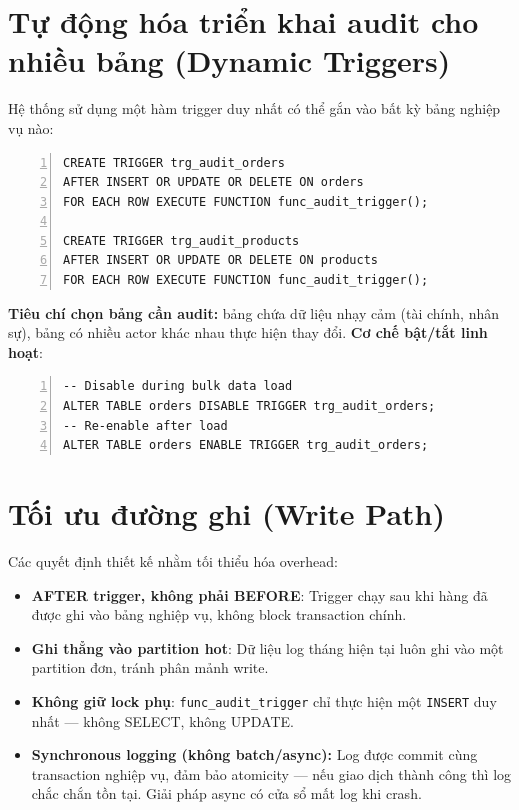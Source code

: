 \section{Tự động hóa triển khai audit cho nhiều bảng (Dynamic Triggers)}

Hệ thống sử dụng một hàm trigger duy nhất có thể gắn vào bất kỳ bảng nghiệp vụ nào:

\begin{center}
\label{lst:create-trigger}
\begin{Verbatim}[frame=single, fontsize=\footnotesize, numbers=left, numbersep=5pt, breaklines]
CREATE TRIGGER trg_audit_orders
AFTER INSERT OR UPDATE OR DELETE ON orders
FOR EACH ROW EXECUTE FUNCTION func_audit_trigger();

CREATE TRIGGER trg_audit_products
AFTER INSERT OR UPDATE OR DELETE ON products
FOR EACH ROW EXECUTE FUNCTION func_audit_trigger();
\end{Verbatim}
\end{center}

\textbf{Tiêu chí chọn bảng cần audit:} bảng chứa dữ liệu nhạy cảm (tài chính, nhân sự), bảng có nhiều actor khác nhau thực hiện thay đổi. \textbf{Cơ chế bật/tắt linh hoạt}:

\begin{center}
\label{lst:enable-disable-trigger}
\begin{Verbatim}[frame=single, fontsize=\footnotesize, numbers=left, numbersep=5pt, breaklines]
-- Disable during bulk data load
ALTER TABLE orders DISABLE TRIGGER trg_audit_orders;
-- Re-enable after load
ALTER TABLE orders ENABLE TRIGGER trg_audit_orders;
\end{Verbatim}
\end{center}

\section{Tối ưu đường ghi (Write Path)}

Các quyết định thiết kế nhằm tối thiểu hóa overhead:

\begin{itemize}
    \item \textbf{AFTER trigger, không phải BEFORE}: Trigger chạy sau khi hàng đã được ghi vào bảng nghiệp vụ, không block transaction chính.
    \item \textbf{Ghi thẳng vào partition hot}: Dữ liệu log tháng hiện tại luôn ghi vào một partition đơn, tránh phân mảnh write.
    \item \textbf{Không giữ lock phụ}: \texttt{func\_audit\_trigger} chỉ thực hiện một \texttt{INSERT} duy nhất --- không SELECT, không UPDATE.
    \item \textbf{Synchronous logging (không batch/async):} Log được commit cùng transaction nghiệp vụ, đảm bảo atomicity --- nếu giao dịch thành công thì log chắc chắn tồn tại. Giải pháp async có cửa sổ mất log khi crash.
\end{itemize}


